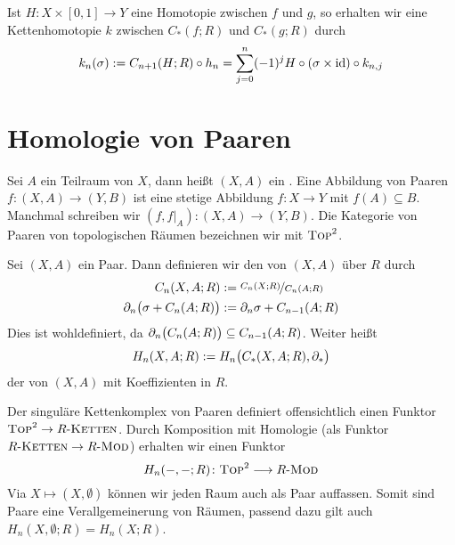 \begin{bemerkung}[{name=[Konstruktion einer Kettenhomotopie aus einer Homotopie]}]
	Ist $H \colon X \times [0,1] \to Y$ eine Homotopie zwischen $f$ und $g$, so erhalten wir eine Kettenhomotopie $k$ zwischen $C_*(f;R)$ und $C_*(g;R)$ durch
	\[
		k_n(\sigma) := C_{n+1}(H;R) \circ h_n = \sum_{j=0}^{n} (-1)^j H \circ (\sigma \times \id) \circ k_{n,j}
	\]
\end{bemerkung}

\newpage

\section{Homologie von Paaren} %
\label{sec:8}

\begin{definition}[{name=[Paar von topologischen Räumen]}]
	Sei $A$ ein Teilraum von $X$, dann heißt $(X,A)$ ein . 
	Eine Abbildung von Paaren $f \colon (X,A) \to (Y,B)$ ist eine stetige Abbildung $f \colon X \to Y$ mit $f(A) \subseteq B$. 
	Manchmal schreiben wir $(f,f|_{A}) \colon (X,A) \to (Y,B)$. 
	Die Kategorie von Paaren von topologischen Räumen bezeichnen wir mit $\TOP^2$.
\end{definition}

\begin{definition}[{name=[Singulärer Kettenkomplex und Homologiemodul von Paaren]}]
	Sei $(X,A)$ ein Paar. Dann definieren wir den  von $(X,A)$ über $R$ durch
	\begin{align*}
		C_n(X,A;R) &:= \nicefrac{C_n(X;R)}{C_n(A;R)} \\
		\partial_n \enbrace[\big]{\sigma+ C_n(A;R)} &:= \partial_n \sigma + C_{n-1}(A;R)
	\end{align*}
	Dies ist wohldefiniert, da $\partial_n \enbrace[\big]{C_n(A;R)} \subseteq C_{n-1}(A;R)$. Weiter heißt
	\[
		H_n(X,A;R) := H_n \enbrace[\big]{C_*(X,A;R),\partial_*} 
	\]
	der  von $(X,A)$ mit Koeffizienten in $R$.
\end{definition}

\begin{bemerkung}[{name=[Der singuläre Kettenkomplex von Paaren definiert einen Funktor]}]
	Der singuläre Kettenkomplex von Paaren definiert offensichtlich einen Funktor $\TOP^2 \to R\text{-}\textsc{Ketten}$. 
	Durch Komposition mit Homologie (als Funktor $R\text{-}\textsc{Ketten} \to R\text{-}\MOD$) erhalten wir einen Funktor
	\[
		H_n(-,-;R) \colon \TOP^2 \longrightarrow R\text{-}\MOD
	\]
	Via $X \mapsto (X,\emptyset)$ können wir jeden Raum auch als Paar auffassen.
	Somit sind Paare eine Verallgemeinerung von Räumen, passend dazu gilt auch $H_n(X,\emptyset;R) = H_n(X;R)$.
\end{bemerkung}

